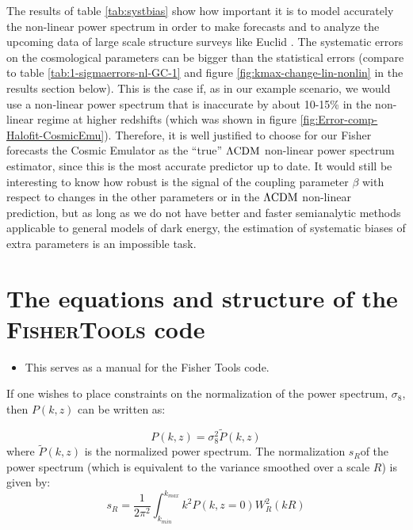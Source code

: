 The results of table \ref{tab:systbias} show how important it is
to model accurately the non-linear power spectrum in order to make
forecasts and to analyze the upcoming data of large scale structure
surveys like Euclid \cite{amendola_cosmology_2012-short}. The systematic
errors on the cosmological parameters can be bigger than the statistical
errors (compare to table \ref{tab:1-sigmaerrors-nl-GC-1} and figure
\ref{fig:kmax-change-lin-nonlin} in the results section below). This
is the case if, as in our example scenario, we would use a non-linear
power spectrum that is inaccurate by about 10-15\% in the non-linear
regime at higher redshifts (which was shown in figure \ref{fig:Error-comp-Halofit-CosmicEmu}).
Therefore, it is well justified to choose for our Fisher forecasts
the Cosmic Emulator as the ``true'' $\Lambda\mathrm{CDM}$ non-linear power spectrum
estimator, since this is the most accurate predictor up to date. It
would still be interesting to know how robust is the signal of the
coupling parameter $\beta$ with respect to changes in the other parameters
or in the $\Lambda\mathrm{CDM}$ non-linear prediction, but as long as we do not
have better and faster semianalytic methods applicable to general
models of dark energy, the estimation of systematic biases of extra
parameters is an impossible task.

\section{The equations and structure of the \textsc{FisherTools} code \label{sec:FisherTools-code}}
\begin{itemize}
\item This serves as a manual for the Fisher Tools code.
\end{itemize}

If one wishes to place constraints on the normalization of the power
spectrum, $\sigma_{8}$, then $P(k,z)$ can be written as:

\begin{equation}
P(k,z)=\sigma_{8}^{2}\tilde{P}(k,z)\label{eq:normalizedPk}
\end{equation}
where $\tilde{P}(k,z)$ is the normalized power spectrum. The normalization
$s_{R}$of the power spectrum (which is equivalent to the variance
smoothed over a scale $R$) is given by:
\begin{equation}
s_{R}=\frac{1}{2\pi^{2}}\int_{k_{min}}^{k_{max}}k^{2}P(k,z=0)W_{R}^{2}(kR)\label{eq:normalizationPk}
\end{equation}


